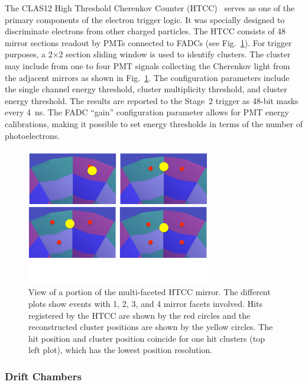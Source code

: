 The CLAS12 High Threshold Cherenkov Counter (HTCC)~\cite{htcc-ref} serves as one of the primary
components of the electron trigger logic. It was specially designed to discriminate electrons from other
charged particles. The HTCC consists of 48 mirror sections readout by PMTs connected to FADCs (see
Fig.~\ref{fig:multihitHTCC}). For trigger purposes, a 2$\times$2 section sliding window is used to identify
clusters. The cluster may include from one to four PMT signals collecting the Cherenkov light from the adjacent
mirrors as shown in  Fig.~\ref{fig:multihitHTCC}. The configuration parameters include the single channel
energy threshold, cluster multiplicity threshold, and cluster energy threshold. The results are reported to
the Stage~2 trigger as 48-bit masks every 4~ns. The FADC ``gain'' configuration parameter allows for PMT
energy calibrations, making it possible to set energy thresholds in terms of the number of photoelectrons.

\begin{figure}[htp]
	\begin{center}
		\centering
		\includegraphics[width=8cm]{img/multiHits.pdf}
		\caption{View of a portion of the multi-faceted HTCC mirror. The different plots show events with
                  1, 2, 3, and 4 mirror facets involved. Hits registered by the HTCC are shown by the red circles and
                  the reconstructed cluster positions are shown by the yellow circles. The hit position and cluster
                  position coincide for one hit clusters (top left plot), which has the lowest position resolution.}
		\label{fig:multihitHTCC}
	\end{center}
\end{figure} 

\subsubsection{Drift Chambers}
\label{sec:DC}

